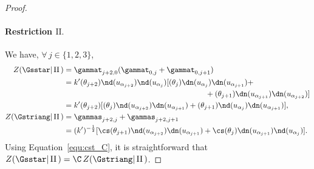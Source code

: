 \documentclass[a4paper,twoside,11pt]{article}
\begin{document}
\begin{proof}
\paragraph{Restriction $\mathrm{II}.$}
We have, $\forall\,j\in\{1,2,3\}$,
\begin{align*}
Z(\Gsstar|\,\mathrm{II}\,)&=\gammat_{j+2,0}(\gammat_{0,j}+\gammat_{0,j+1})\\
&=k'\sc(\theta_{j+2})\nd(u_{\alpha_{j+2}})\nd(u_{\alpha_j})
  [\sc(\theta_j)\dn(u_{\alpha_j})\dn(u_{\alpha_{j+1}})  + \\
&\hspace{6.5cm}  +\sc(\theta_{j+1})\dn(u_{\alpha_{j+1}})\dn(u_{\alpha_{j+2}})]\\
  &=k'\sc(\theta_{j+2})[\sc(\theta_j)\nd(u_{\alpha_{j+2}})\dn(u_{\alpha_{j+1}})+
  \sc(\theta_{j+1})\nd(u_{\alpha_j})\dn(u_{\alpha_{j+1}})],\\
Z(\Gstriang|\,\mathrm{II}\,)&=\gammas_{j+2,j}+\gammas_{j+2,j+1}\\
&=(k')^{-\frac{1}{2}}[\cs(\theta_{j+1})\nd(u_{\alpha_{j+2}})\dn(u_{\alpha_{j+1}})+
\cs(\theta_{j})\dn(u_{\alpha_{j+1}})\nd(u_{\alpha_j})].
\end{align*}
Using Equation~\eqref{equ:cst_C}, it is straightforward that $Z(\Gsstar|\,\mathrm{II}\,)=\C \,Z(\Gstriang|\,\mathrm{II}\,)$.


\end{proof}
\end{document}
